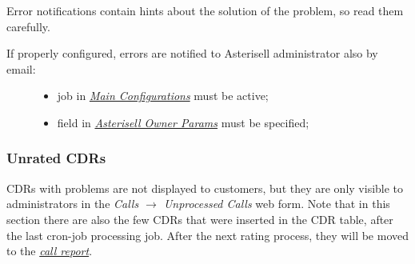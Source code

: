 \documentclass[letterpaper,10pt,english]{sphinxmanual}
\begin{document}
Error notifications contain hints about the solution of the problem, so read them carefully.
\begin{description}
\item[{If properly configured, errors are notified to Asterisell administrator also by email:}] \leavevmode\begin{itemize}
\item {} 
job  in {\hyperref[index:main-configurations]{\emph{Main Configurations}}} must be active;

\item {} 
 field in {\hyperref[index:asterisell-owner]{\emph{Asterisell Owner Params}}} must be specified;

\end{itemize}

\end{description}


\subsubsection{Unrated CDRs}
\label{index:unrated-cdrs}
CDRs with problems are not displayed to customers, but they are only visible to administrators in the \emph{Calls \(\rightarrow\) Unprocessed Calls} web form. Note that in this section there are also the few CDRs that were inserted in the CDR table, after the last cron-job processing job. After the next rating process, they will be moved to the {\hyperref[index:term-call-report]{\emph{call report}}}.
\end{document}
